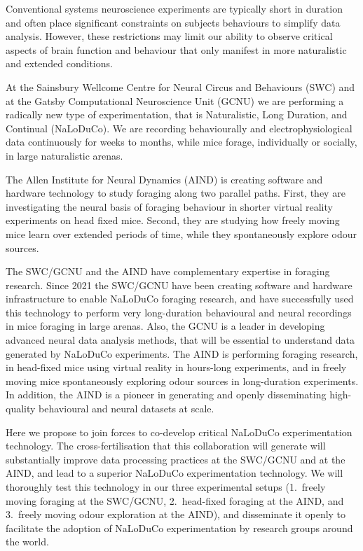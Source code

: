 
Conventional systems neuroscience experiments are typically short in duration
and often place significant constraints on subjects behaviours to simplify data
analysis.
%
However, these restrictions may limit our ability to observe critical
aspects of brain function and behaviour that only manifest in more naturalistic
and extended conditions.

At the Sainsbury Wellcome Centre for Neural Circus and Behaviours (SWC) and at
the Gatsby Computational Neuroscience Unit (GCNU) we are performing a radically
new type of experimentation, that is Naturalistic, Long Duration, and Continual
(NaLoDuCo). We are recording behaviourally and electrophysiological data
continuously for weeks to months, while mice forage, individually or socially, in
large naturalistic arenas.

The Allen Institute for Neural Dynamics (AIND) is creating software and hardware
technology to study foraging along two parallel paths. First, they are
investigating the neural basis of foraging behaviour in shorter virtual reality
experiments on head fixed mice. Second, they are studying how freely moving
mice learn over extended periods of time, while they spontaneously explore odour
sources.

The SWC/GCNU and the AIND have complementary expertise in foraging research.
%
Since 2021 the SWC/GCNU have been creating software and hardware infrastructure
to enable NaLoDuCo foraging research, and have successfully used this
technology to perform very long-duration behavioural and neural recordings in
mice foraging in large arenas.
%
Also, the GCNU is a leader in developing advanced neural data analysis methods,
that will be essential to understand data generated by NaLoDuCo experiments.
%
The AIND is performing foraging research, in head-fixed mice using virtual
reality in hours-long experiments, and in freely moving mice spontaneously
exploring odour sources in long-duration experiments.
%
In addition, the AIND is a pioneer in generating and openly disseminating
high-quality behavioural and neural datasets at scale.

Here we propose to join forces to co-develop critical NaLoDuCo experimentation
technology. The cross-fertilisation that this collaboration will generate will
substantially improve data processing practices at the SWC/GCNU and at the
AIND, and lead to a superior NaLoDuCo experimentation technology. We will
thoroughly test this technology in our three experimental setups (1.\ freely
moving foraging at the SWC/GCNU, 2.\ head-fixed foraging at the AIND, and 3.\
freely moving odour exploration at the AIND), and disseminate it openly to
facilitate the adoption of NaLoDuCo experimentation by research groups around
the world.
